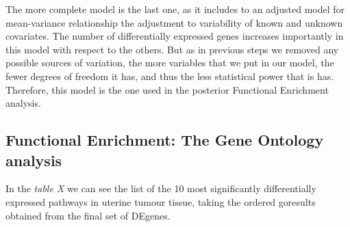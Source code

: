 \documentclass[9pt,twocolumn,twoside]{gsajnl}
\begin{document}
The more complete model is the last one, as it includes to an adjusted model for mean-variance relationship the adjustment to variability of known and unknown covariates. The number of differentially expressed genes increases importantly in this model with respect to the others. But as in previous steps we removed any possible sources of variation, the more variables that we put in our model, the fewer degrees of freedom it has, and thus the less statistical power that is has. Therefore, this model is the one used in the posterior Functional Enrichment analysis.

\subsection{Functional Enrichment: The Gene Ontology analysis}

In the \textit{table X} we can see the list of the 10 most significantly differentially expressed pathways in uterine tumour tissue, taking the ordered goresults obtained from the final set of DEgenes. 
\end{document}
